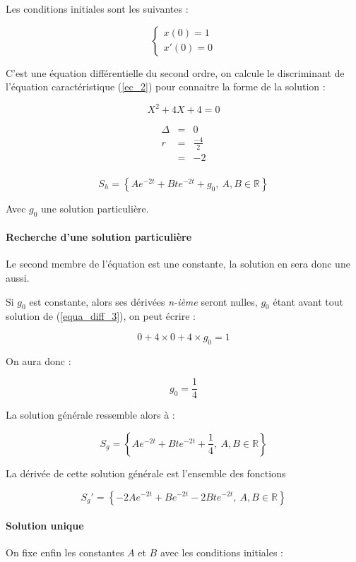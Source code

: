 \documentclass[a4paper, 11pt]{report} %
\newcommand{\R}{\mathbb{R}}
\begin{document}
Les conditions initiales sont les suivantes :

\[
\left\{\begin{array}{l}
x(0) = 1\\
x'(0) = 0
\end{array}\right.
\]

C'est une équation différentielle du second ordre, on calcule le discriminant de l'équation caractéristique (\ref{ec_2})
pour connaitre la forme de la solution :

\begin{equation}
X^2 + 4X + 4 = 0
\label{ec_2}
\end{equation}

\begin{eqnarray*}
    \Delta & = & 0\\
    r & = & \frac{-4}{2}\\
    & = & -2\\
\end{eqnarray*}

\[
S_h = \left\{Ae^{-2t} + Bte^{-2t} + g_0,~A,B\in\R\right\}
\]

Avec $g_0$ une solution particulière.

\paragraph{Recherche d'une solution particulière}

Le second membre de l'équation est une constante, la solution en sera donc une aussi.

Si $g_0$ est constante, alors ses dérivées \textit{n-ième} seront nulles, $g_0$ étant avant tout solution de
(\ref{equa_diff_3}), on peut écrire :

\[ 0 + 4\times0 + 4\times g_0 = 1 \]

On aura donc :

\[
g_0 = \frac{1}{4}
\]


La solution générale ressemble alors à :

\[
S_g = \left\{Ae^{-2t} + Bte^{-2t} + \frac{1}{4},~A,B\in\R\right\}
\]

La dérivée de cette solution générale est l'ensemble des fonctions

\[
S_g' = \left\{-2Ae^{-2t} + Be^{-2t} - 2Bte^{-2t},~A,B\in\R\right\}
\]

\paragraph{Solution unique}
On fixe enfin les constantes $A$ et $B$ avec les conditions initiales :
\end{document}
